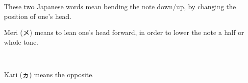 ﻿These two Japanese words mean bending the note down/up, by changing the position of one’s head.

\noindent
{}
\parbox[b][8cm][c]{0.4\textwidth}{Meri (メ) means to lean one’s head forward, in order to lower the note a half or whole tone.}\\
\vspace{0.3cm}
\parbox[b][8cm][c]{0.4\textwidth}{Kari (ヵ) means the opposite.}

